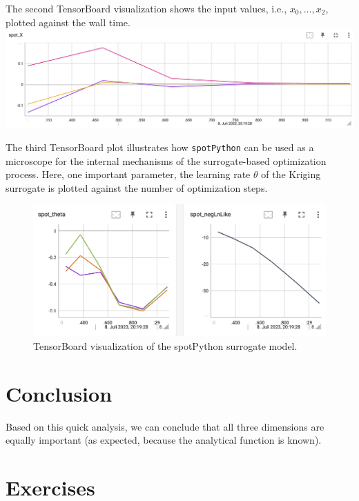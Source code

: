 \documentclass[
  letterpaper,
  DIV=11,
  numbers=noendperiod]{scrreprt}
\begin{document}
The second TensorBoard visualization shows the input values, i.e.,
\(x_0, \ldots, x_2\), plotted against the wall time.
\includegraphics{figures_static/02_tensorboard_02.png}

The third TensorBoard plot illustrates how \texttt{spotPython} can be
used as a microscope for the internal mechanisms of the surrogate-based
optimization process. Here, one important parameter, the learning rate
\(\theta\) of the Kriging surrogate is plotted against the number of
optimization steps.

\begin{figure}[H]

{\centering \includegraphics[width=1\textwidth,height=\textheight]{figures_static/02_tensorboard_03.png}

}

\caption{TensorBoard visualization of the spotPython surrogate model.}

\end{figure}%

\section{Conclusion}\label{conclusion}

Based on this quick analysis, we can conclude that all three dimensions
are equally important (as expected, because the analytical function is
known).

\section{Exercises}\label{exercises-2}
\end{document}
